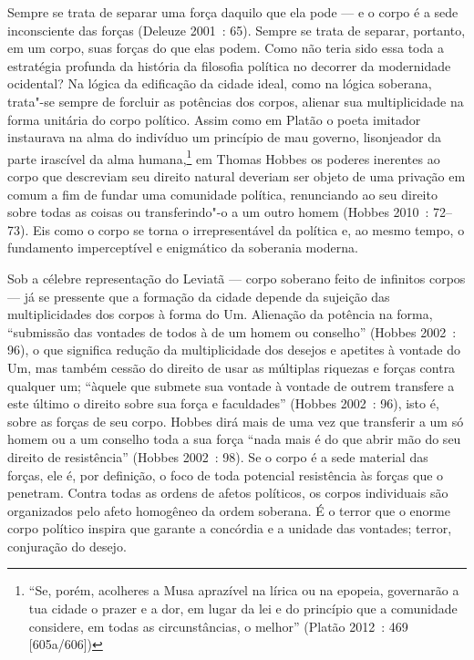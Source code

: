 Sempre se trata de separar uma força daquilo que ela pode --- e o corpo é
a sede inconsciente das forças (Deleuze 2001~: 65). Sempre se trata de
separar, portanto, em um corpo, suas forças do que elas podem. Como não
teria sido essa toda a estratégia profunda da história da filosofia
política no decorrer da modernidade ocidental? Na lógica da edificação
da cidade ideal, como na lógica soberana, trata"-se sempre de forcluir as
potências dos corpos, alienar sua multiplicidade na forma unitária do
corpo político. Assim como em Platão o poeta imitador instaurava na alma
do indivíduo um princípio de mau governo, lisonjeador da parte irascível
da alma humana,\footnote{``Se, porém, acolheres a Musa
  aprazível na lírica ou na epopeia, governarão a tua cidade o prazer e
  a dor, em lugar da lei e do princípio que a comunidade considere, em
  todas as circunstâncias, o melhor'' (Platão 2012~: 469 {[}605a/606{]})}
em Thomas Hobbes os poderes inerentes ao corpo que descreviam seu
direito natural deveriam ser objeto de uma privação em comum a fim de
fundar uma comunidade política, renunciando ao seu direito sobre todas
as coisas ou transferindo"-o a um outro homem (Hobbes 2010~: 72--73). Eis
como o corpo se torna o irrepresentável da política e, ao mesmo tempo, o
fundamento imperceptível e enigmático da soberania moderna.

Sob a célebre representação do Leviatã --- corpo soberano feito de
infinitos corpos --- já se pressente que a formação da cidade depende da
sujeição das multiplicidades dos corpos à forma do Um. Alienação da
potência na forma, ``submissão das vontades de todos à de um homem ou
conselho'' (Hobbes 2002~: 96), o que significa redução da multiplicidade
dos desejos e apetites à vontade do Um, mas também cessão do direito de
usar as múltiplas riquezas e forças contra qualquer um; ``àquele que
submete sua vontade à vontade de outrem transfere a este último o
direito sobre sua força e faculdades'' (Hobbes 2002~: 96), isto é, sobre
as forças de seu corpo. Hobbes dirá mais de uma vez que transferir a um
só homem ou a um conselho toda a sua força ``nada mais é do que abrir
mão do seu direito de resistência'' (Hobbes 2002~: 98). Se o corpo é a
sede material das forças, ele é, por definição, o foco de toda potencial
resistência às forças que o penetram. Contra todas as ordens de afetos
políticos, os corpos individuais são organizados pelo afeto homogêneo da
ordem soberana. É o terror que o enorme corpo político inspira que
garante a concórdia e a unidade das vontades; terror, conjuração do
desejo.

